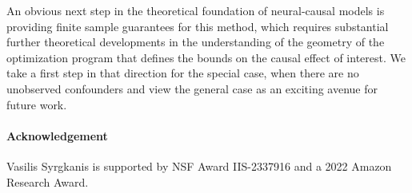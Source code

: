 \documentclass[12pt]{article}
\theoremstyle{plain}
\theoremstyle{definition}
\theoremstyle{remark}
\begin{document}
An obvious next step in the theoretical foundation of neural-causal models is providing finite sample guarantees for this method, which requires substantial further theoretical developments in the understanding of the geometry of the optimization program that defines the bounds on the causal effect of interest. We take a first step in that direction for the special case, when there are no unobserved confounders and view the general case as an exciting avenue for future work.

\paragraph{Acknowledgement}
Vasilis Syrgkanis is supported by NSF Award IIS-2337916 and a 2022 Amazon Research Award. 







\newpage

\appendix

\end{document}
